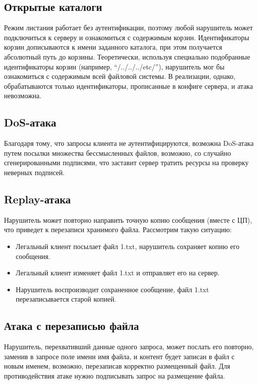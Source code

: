 \documentclass[a4paper,12pt]{article}
\begin{document}
\subsection{Открытые каталоги}

Режим листания работает без аутентификации, поэтому любой нарушитель может подключиться к серверу и ознакомиться с содержимым корзин.
Идентификаторы корзин дописываются к имени заданного каталога, при этом получается абсолютный путь до корзины. 
Теоретически, используя специально подобранные идентификаторы корзин (например, ``/../../../etc/''), нарушитель мог бы ознакомиться с содержимым всей файловой системы. В реализации, однако, обрабатываются только идентификаторы, прописанные в конфиге сервера, и атака невозможна.

\subsection{DoS-атака}

Благодаря тому, что запросы клиента не аутентифицируются, возможна DoS-атака путем посылки множества бессмысленных файлов, возможно, со случайно сгенерированными подписями, что заставит сервер тратить ресурсы на проверку неверных подписей.

\subsection{Replay-атака}

Нарушитель может повторно направить точную копию сообщения (вместе с ЦП), что приведет к перезаписи хранимого файла. Рассмотрим такую ситуацию:
\begin{itemize}
 \item Легальный клиент посылает файл 1.txt, нарушитель сохраняет копию его сообщения.
 \item Легальный клиент изменяет файл 1.txt и отправляет его на сервер.
 \item Нарушитель воспроизводит сохраненное сообщение, файл 1.txt перезаписывается старой копией.
\end{itemize}

\subsection{Атака с перезаписью файла} 

Нарушитель, перехвативший данные одного запроса, может послать его повторно, заменив  в запросе поле имени имя файла, и контент будет записан в файл с новым именем, возможно, перезаписав корректно размещенный файл. Для противодействия атаке нужно подписывать запрос на размещение файла.
\end{document}
